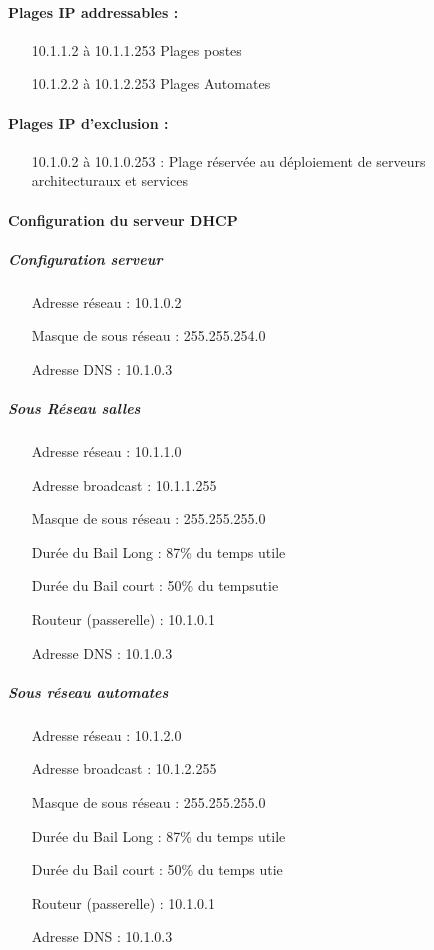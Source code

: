 \documentclass[a4paper]{article}
\begin{document}
\paragraph{Plages IP addressables :} 
\begin{itemize}
\item[10.1.1.2 à 10.1.1.253] Plages postes
\item[10.1.2.2 à 10.1.2.253] Plages Automates
\end{itemize}


\paragraph{Plages IP d'exclusion :}
\begin{itemize}
\item[10.1.0.2 à 10.1.0.253] : Plage réservée au déploiement de serveurs architecturaux et services
\end{itemize}

\paragraph{Configuration du serveur DHCP}

\subparagraph{Configuration serveur}
\begin{itemize}
\item[Adresse réseau]: 10.1.0.2
\item[Masque de sous réseau]: 255.255.254.0
\item[Adresse DNS]: 10.1.0.3
\end{itemize}

\subparagraph{Sous Réseau salles}
\begin{itemize}
\item[Adresse réseau]: 10.1.1.0
\item[Adresse broadcast]: 10.1.1.255
\item[Masque de sous réseau]: 255.255.255.0
\item[Durée du Bail Long]: 87\% du temps utile
\item[Durée du Bail court]: 50\% du tempsutie
\item[Routeur (passerelle)]: 10.1.0.1
\item[Adresse DNS]: 10.1.0.3
\end{itemize}

\subparagraph{Sous réseau automates}
\begin{itemize}
\item[Adresse réseau]: 10.1.2.0
\item[Adresse broadcast]: 10.1.2.255
\item[Masque de sous réseau]: 255.255.255.0
\item[Durée du Bail Long]: 87\% du temps utile
\item[Durée du Bail court]: 50\% du temps utie
\item[Routeur (passerelle)]: 10.1.0.1
\item[Adresse DNS]: 10.1.0.3
\end{itemize}
\end{document}
